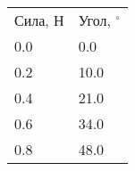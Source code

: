 \begin{tabular}{ll}
\hline
 Сила, Н & Угол, $^\circ$ \\
 0.0     & 0.0            \\
 0.2     & 10.0           \\
 0.4     & 21.0           \\
 0.6     & 34.0           \\
 0.8     & 48.0           \\
\hline
\end{tabular}